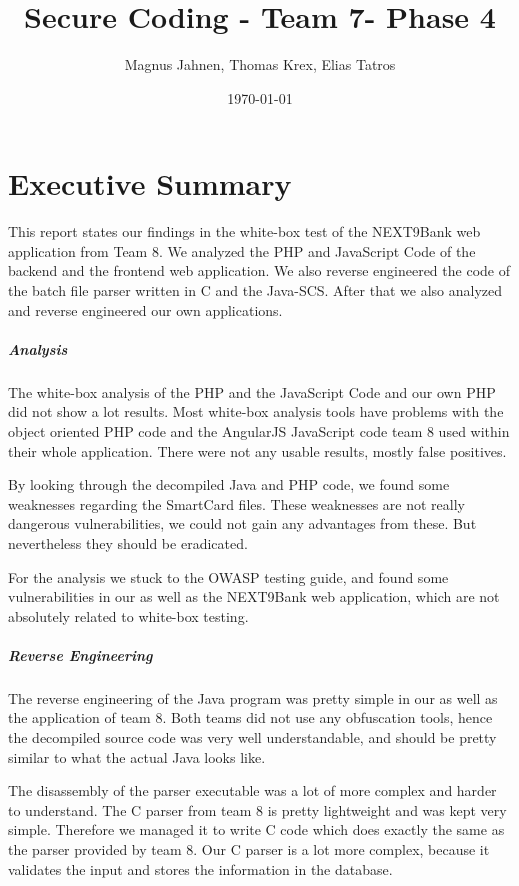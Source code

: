 \documentclass{report}
\title{Secure Coding - Team 7- Phase 4}
\author{Magnus Jahnen, Thomas Krex, Elias Tatros}
\date{\today}
\begin{document}
\maketitle

\part{Executive Summary}

This report states our findings in the white-box test of the NEXT9Bank web application from Team 8. We analyzed the PHP and JavaScript Code of the backend and the frontend web application. We also reverse engineered the code of the batch file parser written in C and the Java-SCS. After that we also analyzed and reverse engineered our own applications.

\subsubsection{Analysis}

The white-box analysis of the PHP and the JavaScript Code and our own PHP did not show a lot results. Most white-box analysis tools have problems with the object oriented PHP code and the AngularJS JavaScript code team 8 used within their whole application. There were not any usable results, mostly false positives.

By looking through the decompiled Java and PHP code, we found some weaknesses regarding the SmartCard files. These weaknesses are not really dangerous vulnerabilities, we could not gain any advantages from these. But nevertheless they should be eradicated.

For the analysis we stuck to the OWASP testing guide, and found some vulnerabilities in our as well as the NEXT9Bank web application, which are not absolutely related to white-box testing.

\subsubsection{Reverse Engineering}

The reverse engineering of the Java program was pretty simple in our as well as the application of team 8. Both teams did not use any obfuscation tools, hence the decompiled source code was very well understandable, and should be pretty similar to what the actual Java looks like.

The disassembly of the parser executable was a lot of more complex and harder to understand. The C parser from team 8 is pretty lightweight and was kept very simple. Therefore we managed it to write C code which does exactly the same as the parser provided by team 8. Our C parser is a lot more complex, because it validates the input and stores the information in the database.
\end{document}
